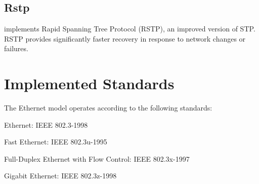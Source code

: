 \subsection{Rstp}
\label{sec:ethernet:rstp}

 implements Rapid Spanning Tree Protocol (RSTP), an improved
version of STP. RSTP provides significantly faster recovery in response to
network changes or failures.


\section{Implemented Standards}
\label{sec:ethernet:implemented-standards}

The Ethernet model operates according to the following standards:

\begin{compactitem}
  \item Ethernet: IEEE 802.3-1998
  \item Fast Ethernet: IEEE 802.3u-1995
  \item Full-Duplex Ethernet with Flow Control: IEEE 802.3x-1997
  \item Gigabit Ethernet: IEEE 802.3z-1998
\end{compactitem}


